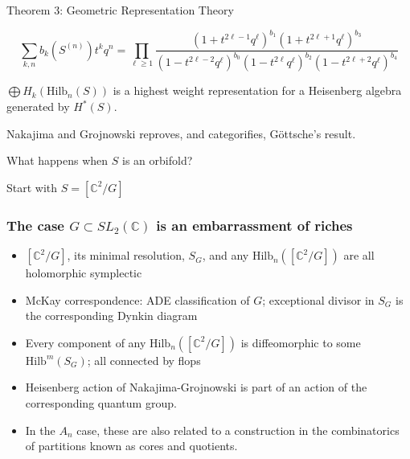 \documentclass{beamer}
\newcommand{\Hilb}{\textrm{Hilb}}
\newcommand{\C}{\mathbb{C}}
\begin{document}
\begin{frame}{Theorem 3: Geometric Representation Theory}
  \begin{Theorem}[G\"ottsche, 1990]
$$\sum_{k,n} b_k(S^{(n)})t^k q^n=\prod_{\ell\geq 1} \frac{(1+t^{2\ell-1}q^\ell)^{b_1}(1+t^{2\ell+1}q^\ell)^{b_3}}{(1-t^{2\ell-2}q^\ell)^{b_0}(1-t^{2\ell}q^\ell)^{b_2}(1-t^{2\ell+2}q^\ell)^{b_4}}$$
\end{Theorem}
\begin{Theorem}
$\bigoplus H_k(\Hilb_n(S))$ is a highest weight representation for a Heisenberg algebra generated by $H^*(S)$.
\end{Theorem}
Nakajima and Grojnowski reproves, and categorifies, G\"ottsche's
result.  
\end{frame}

\begin{frame}[plain,c]

\begin{center}

\Huge


 
 What happens when $S$ is an orbifold?
\end{center}

\begin{center}
\Huge
Start with $S=[\C^2/G]$
\end{center}

\end{frame}



\begin{frame}
  \frametitle{The case  $G\subset SL_2(\C)$ is an embarrassment of riches}

\begin{itemize}
\item $[\C^2/G]$, its minimal resolution, $S_G$, and any
  $\Hilb_n([\C^2/G])$ are all holomorphic
symplectic
\item McKay correspondence: ADE classification of $G$; exceptional
  divisor in $S_G$ is the corresponding Dynkin diagram 
\item Every component of any $\Hilb_n([\C^2/G])$ is diffeomorphic to
  some $\Hilb^m(S_G)$; all connected by flops
\item Heisenberg action of Nakajima-Grojnowski is part of an action of
  the corresponding quantum group.  
\item  In the $A_n$ case, these are also related to a construction in the
combinatorics of partitions known as cores and quotients.
\end{itemize}

\end{frame}
\end{document}
